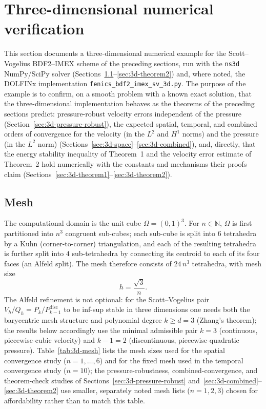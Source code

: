 \documentclass[11pt]{article}
\newcommand{\Vh}{V_h}\newcommand{\Qh}{Q_h}
\begin{document}
\section{Three-dimensional numerical verification}
\label{sec:3d-verification}

This section documents a three-dimensional numerical example for the Scott--Vogelius
BDF2--IMEX scheme of the preceding sections, run with the \texttt{ns3d} NumPy/SciPy
solver (Sections~\ref{sec:3d-mesh}--\ref{sec:3d-theorem2}) and, where noted, the DOLFINx
implementation \texttt{fenics\_bdf2\_imex\_sv\_3d.py}. The purpose of the example is to
confirm, on a smooth problem with a known exact solution, that the three-dimensional
implementation behaves as the theorems of the preceding sections predict: pressure-robust
velocity errors independent of the pressure (Section~\ref{sec:3d-pressure-robust}), the
expected spatial, temporal, and combined orders of convergence for the velocity (in the
$L^2$ and $H^1$ norms) and the pressure (in the $L^2$ norm)
(Sections~\ref{sec:3d-space}--\ref{sec:3d-combined}), and, directly, that the energy
stability inequality of Theorem~1 and the velocity error estimate of Theorem~2 hold
numerically with the constants and mechanisms their proofs claim
(Sections~\ref{sec:3d-theorem1}--\ref{sec:3d-theorem2}).

\subsection{Mesh}
\label{sec:3d-mesh}

The computational domain is the unit cube $\Omega=(0,1)^3$. For $n\in\mathbb N$, $\Omega$
is first partitioned into $n^3$ congruent sub-cubes; each sub-cube is split into $6$
tetrahedra by a Kuhn (corner-to-corner) triangulation, and each of the resulting
tetrahedra is further split into $4$ sub-tetrahedra by connecting its centroid to each of
its four faces (an Alfeld split). The mesh therefore consists of $24\,n^3$ tetrahedra, with
mesh size
\[
h=\frac{\sqrt3}{n}.
\]
The Alfeld refinement is not optional: for the Scott--Vogelius pair $\Vh/\Qh=P_k/P_{k-1}^{\mathrm{disc}}$
to be inf-sup stable in three dimensions one needs both the barycentric mesh structure and
polynomial degree $k\ge d=3$ (Zhang's theorem); the results below accordingly use the
minimal admissible pair $k=3$ (continuous, piecewise-cubic velocity) and $k-1=2$
(discontinuous, piecewise-quadratic pressure). Table~\ref{tab:3d-mesh} lists the mesh
sizes used for the spatial convergence study ($n=1,\dots,6$) and for the fixed mesh used
in the temporal convergence study ($n=10$); the pressure-robustness, combined-convergence,
and theorem-check studies of Sections~\ref{sec:3d-pressure-robust}
and~\ref{sec:3d-combined}--\ref{sec:3d-theorem2} use smaller, separately noted mesh lists
($n=1,2,3$) chosen for affordability rather than to match this table.
\end{document}
